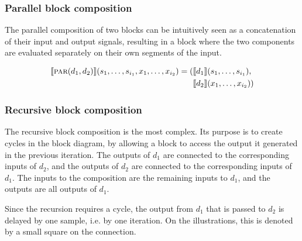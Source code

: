 \subsubsection{Parallel block composition}
The parallel composition of two blocks can be intuitively seen as a concatenation of their input and output
signals, resulting in a block where the two components are evaluated separately on their own segments of the
input.

\begin{minipage}{0.5\linewidth}
  \begin{prooftree}
  \end{prooftree}
  \begin{align*}
    \SigP{\Parallel(d_1, d_2)}(s_1, \dots, s_{i_1}, x_1, \dots, x_{i_2}) ={} ( & \SigP{d_1}(s_1, \dots, s_{i_1}),   \\
                                                                               & \SigP{d_2}(x_{1}, \dots, x_{i_2})) \\
  \end{align*}
\end{minipage}
\begin{minipage}{0.5\linewidth}
  \begin{figure}[H]
    \centering
    \label{fig:block_par}
    
  \end{figure}
\end{minipage}

\subsubsection{Recursive block composition}
The recursive block composition is the most complex. Its purpose is to create cycles in the block diagram, by
allowing a block to access the output it generated in the previous iteration. The outputs of
$d_1$ are connected to the corresponding inputs of $d_2$, and the outputs
of $d_2$ are connected to the corresponding inputs of $d_1$. The inputs to
the composition are the remaining inputs to $d_1$, and the outputs are all outputs of
$d_1$.

Since the recursion requires a cycle, the output from $d_1$ that is passed to
$d_2$ is delayed by one sample, i.e. by one iteration. On the illustrations, this is denoted
by a small square on the connection.

